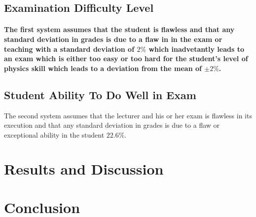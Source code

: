 \documentclass[12pt]{article}
\begin{document}
\subsection{Examination Difficulty Level}

\paragraph{The first system assumes that the student is flawless and that any standard deviation in grades is due to a flaw in in the exam or teaching with a standard deviation of $2\%$ which inadvetantly leads to an exam which is either too easy or too hard for the student's level of physics skill which leads to a deviation from the mean of $\pm{2\%}$. \cite{}}

\subsection{Student Ability To Do Well in Exam}

The second system assumes that the lecturer and his or her exam is flawless in its execution and that any standard deviation in grades is due to a flaw or exceptional ability in the student $22.6\%$.\cite{}


\section{Results and Discussion}

\section{Conclusion}


\end{document}
